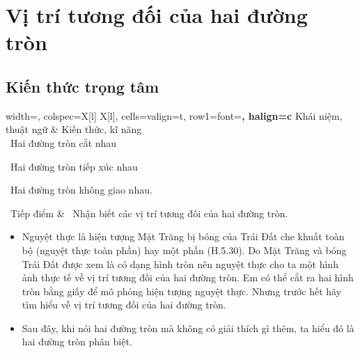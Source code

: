 \setcounter{section}{16}
\section{Vị trí tương đối của hai đường tròn}


\begin{lesson}
    \subsection{Kiến thức trọng tâm}

    \begin{center}
        \begin{tblr}{
            width=\linewidth,
            colspec={X[l] X[l]},
            cells={valign=t},
            row{1}={font=\bfseries, halign=c}
        }
            Khái niệm, thuật ngữ & Kiến thức, kĩ năng \\
            \textbullet\ Hai đường tròn cắt nhau\par
            \textbullet\ Hai đường tròn tiếp xúc nhau\par
            \textbullet\ Hai đường tròn không giao nhau.\par
            \textbullet\ Tiếp điểm
            &
            \textbullet\ Nhận biết các vị trí tương đối của hai đường tròn.
        \end{tblr}
    \end{center}

    \begin{itemize}
        \item Nguyệt thực là hiện tượng Mặt Trăng bị bóng của Trái Đất che khuất toàn bộ (nguyệt thực toàn phần) hay một phần (H.5.30). Do Mặt Trăng và bóng Trái Đất được xem là có dạng hình tròn nên nguyệt thực cho ta một hình ảnh thực tế về vị trí tương đối của hai đường tròn. Em có thể cắt ra hai hình tròn bằng giấy để mô phỏng hiện tượng nguyệt thực. Nhưng trước hết hãy tìm hiểu về vị trí tương đối của hai đường tròn.
        \item Sau đây, khi nói hai đường tròn mà không có giải thích gì thêm, ta hiểu đó là hai đường tròn phân biệt.
    \end{itemize}



\end{lesson}
